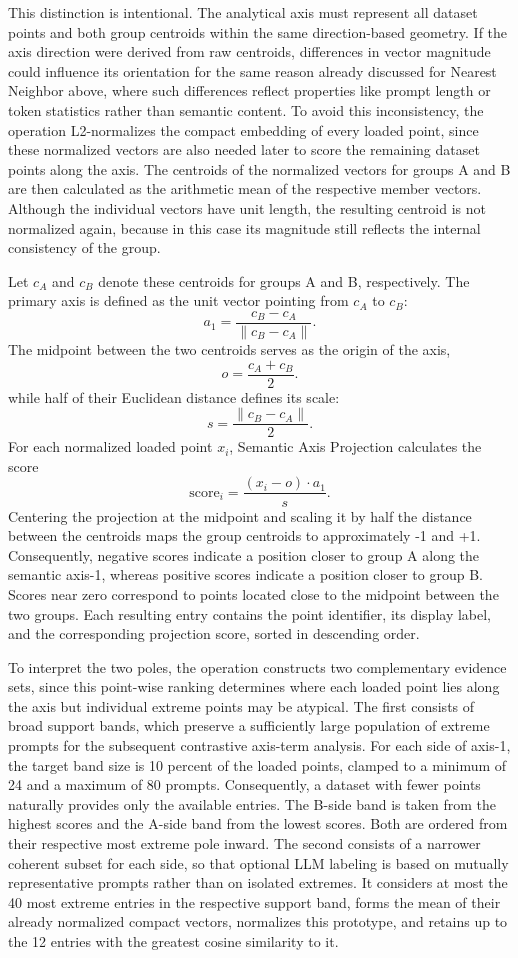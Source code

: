 This distinction is intentional. The analytical axis must represent all dataset points and both group centroids within the same direction-based geometry. If the axis direction were derived from raw centroids, differences in vector magnitude could influence its orientation for the same reason already discussed for Nearest Neighbor above, where such differences reflect properties like prompt length or token statistics rather than semantic content. To avoid this inconsistency, the operation L2-normalizes the compact embedding of every loaded point, since these normalized vectors are also needed later to score the remaining dataset points along the axis. The centroids of the normalized vectors for groups A and B are then calculated as the arithmetic mean of the respective member vectors. Although the individual vectors have unit length, the resulting centroid is not normalized again, because in this case its magnitude still reflects the internal consistency of the group.

Let $c_A$ and $c_B$ denote these centroids for groups A and B, respectively. The primary axis is defined as the unit vector pointing from $c_A$ to $c_B$:
\[
a_1 = \frac{c_B - c_A}{\lVert c_B - c_A \rVert}.
\]
The midpoint between the two centroids serves as the origin of the axis,
\[
o = \frac{c_A + c_B}{2}.
\]
while half of their Euclidean distance defines its scale:
\[
s = \frac{\lVert c_B - c_A \rVert}{2}.
\]
For each normalized loaded point $x_i$, Semantic Axis Projection calculates the score
\[
\mathrm{score}_i = \frac{(x_i - o) \cdot a_1}{s}.
\]
Centering the projection at the midpoint and scaling it by half the distance between the centroids maps the group centroids to approximately -1 and +1. Consequently, negative scores indicate a position closer to group A along the semantic axis-1, whereas positive scores indicate a position closer to group B. Scores near zero correspond to points located close to the midpoint between the two groups. Each resulting entry contains the point identifier, its display label, and the corresponding projection score, sorted in descending order.

To interpret the two poles, the operation constructs two complementary evidence sets, since this point-wise ranking determines where each loaded point lies along the axis but individual extreme points may be atypical. The first consists of broad support bands, which preserve a sufficiently large population of extreme prompts for the subsequent contrastive axis-term analysis. For each side of axis-1, the target band size is 10 percent of the loaded points, clamped to a minimum of 24 and a maximum of 80 prompts. Consequently, a dataset with fewer points naturally provides only the available entries. The B-side band is taken from the highest scores and the A-side band from the lowest scores. Both are ordered from their respective most extreme pole inward. The second consists of a narrower coherent subset for each side, so that optional LLM labeling is based on mutually representative prompts rather than on isolated extremes. It considers at most the 40 most extreme entries in the respective support band, forms the mean of their already normalized compact vectors, normalizes this prototype, and retains up to the 12 entries with the greatest cosine similarity to it.

